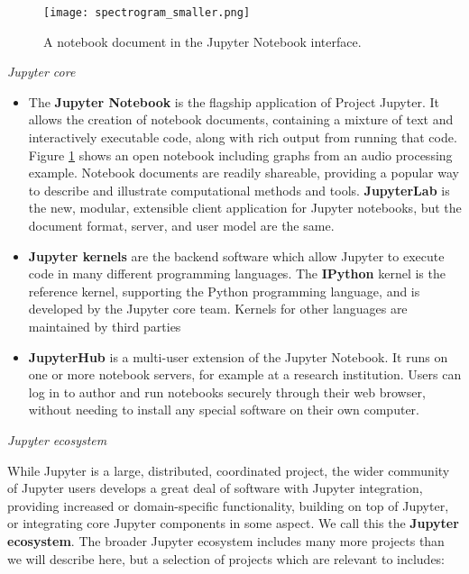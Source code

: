 \begin{figure}[ht]\centering
  \centering
  \texttt{[image: spectrogram\_smaller.png]}
  \caption{A notebook document in the Jupyter Notebook interface.}\label{fig:notebook-screenshot}
\end{figure}

\medskip\noindent\emph{Jupyter core}
\begin{itemize}
  \item The \textbf{Jupyter Notebook} is the flagship application of Project Jupyter.
  It allows the creation of notebook documents, containing a mixture of text and
  interactively executable code, along with rich output from running that code.
  Figure \ref{fig:notebook-screenshot} shows an open notebook including graphs
  from an audio processing example. Notebook documents are readily shareable,
  providing a popular way to describe and illustrate computational methods and
  tools. 
  \textbf{JupyterLab} is the new, modular, extensible client application
  for Jupyter notebooks, but the document format, server, and user model are the same.

  \item \textbf{Jupyter kernels} are the backend software which allow Jupyter to execute
  code in many different programming languages. The \textbf{IPython} kernel is
  the reference kernel, supporting the Python programming language, and is
  developed by the Jupyter core team. Kernels for other languages are maintained
  by third parties

  \item \textbf{JupyterHub} is a multi-user extension of the Jupyter Notebook.
  It runs on one or more notebook servers, for example at a research institution.
  Users can log in to author and run notebooks securely through their web
  browser, without needing to install any special software on their own
  computer.

\end{itemize}

\medskip\noindent\emph{Jupyter ecosystem}\label{jupyter-ecosystem}

While Jupyter is a large, distributed, coordinated project,
the wider community of Jupyter users develops a great deal of
software with Jupyter integration,
providing increased or domain-specific functionality,
building on top of Jupyter, or integrating core Jupyter components in some aspect.
We call this the \textbf{Jupyter ecosystem}.
The broader Jupyter ecosystem includes many more projects than we will describe
here, but a selection of projects which are relevant to
\TheProject includes:

